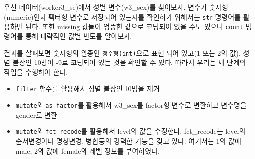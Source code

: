 \documentclass[
]{book}
\newenvironment{Shaded}{\begin{snugshade}}{\end{snugshade}}
\newcommand{\AttributeTok}[1]{\textcolor[rgb]{0.77,0.63,0.00}{#1}}
\newcommand{\DecValTok}[1]{\textcolor[rgb]{0.00,0.00,0.81}{#1}}
\newcommand{\DocumentationTok}[1]{\textcolor[rgb]{0.56,0.35,0.01}{\textbf{\textit{#1}}}}
\newcommand{\FunctionTok}[1]{\textcolor[rgb]{0.00,0.00,0.00}{#1}}
\newcommand{\NormalTok}[1]{#1}
\newcommand{\OtherTok}[1]{\textcolor[rgb]{0.56,0.35,0.01}{#1}}
\newcommand{\SpecialCharTok}[1]{\textcolor[rgb]{0.00,0.00,0.00}{#1}}
\newcommand{\StringTok}[1]{\textcolor[rgb]{0.31,0.60,0.02}{#1}}
\providecommand{\tightlist}{%
  \setlength{\itemsep}{0pt}\setlength{\parskip}{0pt}}
\theoremstyle{definition}
\theoremstyle{definition}
\theoremstyle{definition}
\theoremstyle{definition}
\theoremstyle{remark}
\begin{document}
우선 데이터(worker3\_se)에서 성별 변수(w3\_sex)를 찾아보자. 변수가 숫자형(numeric)인지 팩터형 변수로 저장되어 있는지를 확인하기 위해서는 \texttt{str} 명령어를 활용하면 된다. 또한 missing 값들이 엉뚱한 값으로 코딩되어 있을 수도 있으니 \texttt{count} 명령어를 통해 대략적인 값별 빈도를 알아보자.

\begin{Shaded}
\end{Shaded}

결과를 살펴보면 숫자형의 일종인 \texttt{정수형(int)}으로 표현 되어 있고(1 또는 2의 값), 성별 불상인 10명이 -9로 코딩되어 있는 것을 확인할 수 있다. 따라서 우리는 세 단계의 작업을 수행해야 한다.

\begin{itemize}
\tightlist
\item
  \texttt{filter} 함수를 활용해서 성별 불상인 10명을 제거
\item
  \texttt{mutate}와 \texttt{as\_factor}를 활용해서 w3\_sex를 factor형 변수로 변환하고 변수명을 gender로 변환
\item
  \texttt{mutate}와 \texttt{fct\_recode}를 활용해서 level의 값을 수정한다. fct\_recode는 level의 순서변경이나 명칭변경, 병합등의 강력한 기능을 갖고 있다. 여기서는 1의 값에 male, 2의 값에 female의 레벨 정보를 부여하였다.
\end{itemize}

\begin{Shaded}
\end{Shaded}
\end{document}
